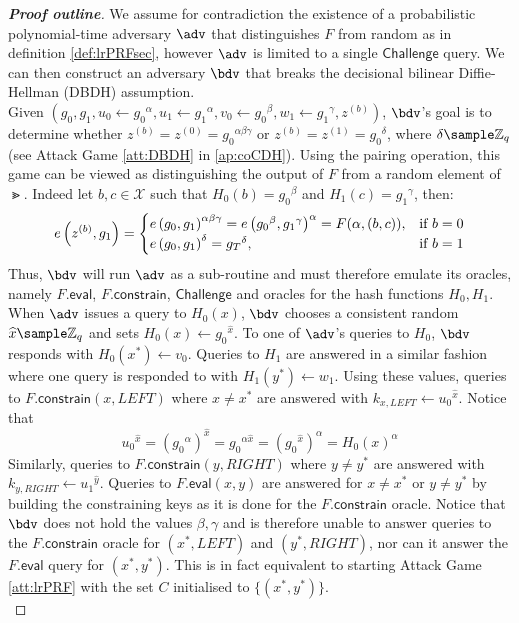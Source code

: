		\begin{proof}[\textbf{Proof outline}]
			We assume for contradiction the existence of a probabilistic polynomial-time adversary $\adv$ that distinguishes $F$ from random as in definition \autoref{def:lrPRFsec}, however $\adv$ is limited to a single $\mathsf{Challenge}$ query. We can then construct an adversary $\bdv$ that breaks the decisional bilinear Diffie-Hellman (DBDH) assumption.\\
			
			Given $(g_0, g_1, u_0 \leftarrow {g_0}^\alpha, u_1 \leftarrow {g_1}^\alpha, v_0 \leftarrow {g_0}^\beta, w_1 \leftarrow {g_1}^\gamma, z^{(b)})$, $\bdv$'s goal is to determine whether $z^{(b)} = z^{(0)} = {g_0}^{\alpha\beta\gamma}$ or $z
			^{(b)} = z^{(1)} = {g_0}^\delta$, where $\delta \sample \mathbb{Z}_q$ (see Attack Game \autoref{att:DBDH} in \autoref{ap:coCDH}). Using the pairing operation, this game can be viewed as distinguishing the output of $F$ from a random element of $\Gt$. Indeed let $b,c \in \mathcal{X}$ such that $H_0(b) = {g_0}^\beta$ and $H_1(c) = {g_1}^\gamma$, then:
			\begin{equation}
				e\left(z^{(b)}, g_1 \right) =
				\begin{cases} e\left(g_0, g_1 \right)^{\alpha\beta\gamma} = e\left({g_0}^\beta, {g_1}^\gamma \right)^\alpha =  F(\alpha, (b, c)), & \text{if } b=0 \\
				 e\left(g_0, g_1 \right)^\delta	= {g_T}^\delta, & \text{if } b=1
				\end{cases}
			\end{equation}
			Thus, $\bdv$ will run $\adv$ as a sub-routine and must therefore emulate its oracles, namely $F.\mathsf{eval}$, $F.\mathsf{constrain}$, $\mathsf{Challenge}$ and oracles for the hash functions $H_0,H_1$. \\
			
			When $\adv$ issues a query to $H_0(x)$, $\bdv$ chooses a consistent random $\widehat x \sample \mathbb{Z}_q$ and sets $H_0(x) \leftarrow {g_0}^{\widehat x}$. To one of $\adv$'s queries to $H_0$, $\bdv$ responds with $H_0(x^*) \leftarrow v_0$. Queries to $H_1$ are answered in a similar fashion where one query is responded to with $H_1(y^*) \leftarrow w_1$. Using these values, queries to $F.\mathsf{constrain}(x,LEFT)$ where $x\neq x^*$ are answered with $k_{x,LEFT} \leftarrow  {u_0}^{\widehat x}$. Notice that
				$$ {u_0}^{\widehat x} = ({g_0}^\alpha)^{\widehat x} = {g_0}^{\alpha \widehat x} = ({g_0}^{\widehat x})^{\alpha} = H_0(x)^\alpha$$
			Similarly, queries to $F.\mathsf{constrain}(y,RIGHT)$ where $y\neq y^*$ are answered with $k_{y,RIGHT} \leftarrow  {u_1}^{\widehat y}$. Queries to $F.\mathsf{eval}(x,y)$ are answered for $x \neq x^*$ or $y \neq y^*$ by building the constraining keys as it is done for the $F.\mathsf{constrain}$ oracle. Notice that $\bdv$ does not hold the values $\beta,\gamma$ and is therefore unable to answer queries to the $F.\mathsf{constrain}$ oracle for $(x^*, LEFT)$ and $(y^*, RIGHT)$, nor can it answer the $F.\mathsf{eval}$ query for $(x^*,y^*)$. This is in fact equivalent to starting Attack Game \autoref{att:lrPRF} with the set $C$ initialised to $\{(x^*,y^*)\}$. \\
			

\end{proof}
